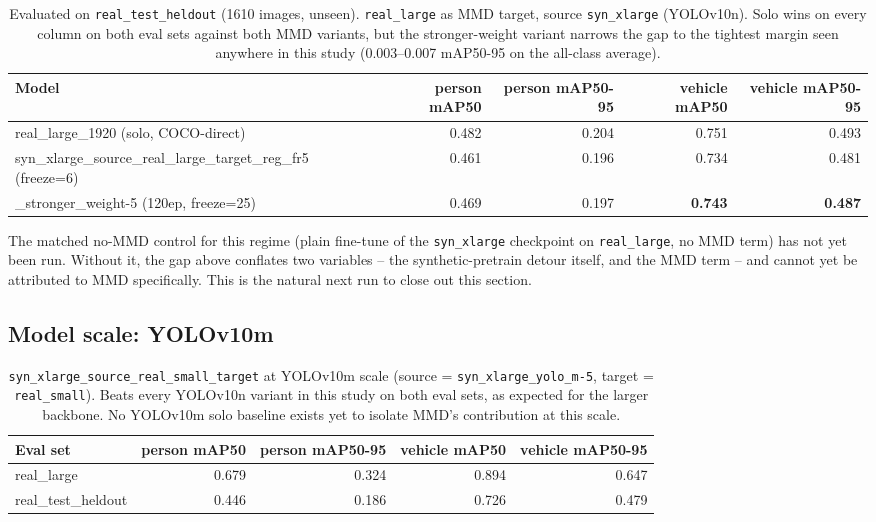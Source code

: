 \documentclass[11pt]{article}
\begin{document}
\begin{table}[h!]
    \centering
    \begin{tabular}{lrrrr}
        \toprule
        Model & person mAP50 & person mAP50-95 & vehicle mAP50 & vehicle mAP50-95 \\
        \midrule
        real\_large\_1920 (solo, COCO-direct) & 0.482 & 0.204 & 0.751 & 0.493 \\
        syn\_xlarge\_source\_real\_large\_target\_reg\_fr5 (freeze=6) & 0.461 & 0.196 & 0.734 & 0.481 \\
        \quad{}\_stronger\_weight-5 (120ep, freeze=25) & 0.469 & 0.197 & \textbf{0.743} & \textbf{0.487} \\
        \bottomrule
    \end{tabular}
    \caption{Evaluated on \texttt{real\_test\_heldout} (1610 images, unseen).
    \texttt{real\_large} as MMD target, source \texttt{syn\_xlarge} (YOLOv10n).
    Solo wins on every column on both eval sets against both MMD variants, but the
    stronger-weight variant narrows the gap to the tightest margin seen anywhere in
    this study (0.003--0.007 mAP50-95 on the all-class average).}
\end{table}

\noindent The matched no-MMD control for this regime (plain fine-tune of the
\texttt{syn\_xlarge} checkpoint on \texttt{real\_large}, no MMD term) has not yet been
run. Without it, the gap above conflates two variables -- the synthetic-pretrain
detour itself, and the MMD term -- and cannot yet be attributed to MMD specifically.
This is the natural next run to close out this section.

\subsection{Model scale: YOLOv10m}

\begin{table}[h!]
    \centering
    \begin{tabular}{lrrrr}
        \toprule
        Eval set & person mAP50 & person mAP50-95 & vehicle mAP50 & vehicle mAP50-95 \\
        \midrule
        real\_large & 0.679 & 0.324 & 0.894 & 0.647 \\
        real\_test\_heldout & 0.446 & 0.186 & 0.726 & 0.479 \\
        \bottomrule
    \end{tabular}
    \caption{\texttt{syn\_xlarge\_source\_real\_small\_target} at YOLOv10m scale
    (source = \texttt{syn\_xlarge\_yolo\_m-5}, target = \texttt{real\_small}).
    Beats every YOLOv10n variant in this study on both eval sets, as expected for
    the larger backbone. No YOLOv10m solo baseline exists yet to isolate MMD's
    contribution at this scale.}
\end{table}
\end{document}
